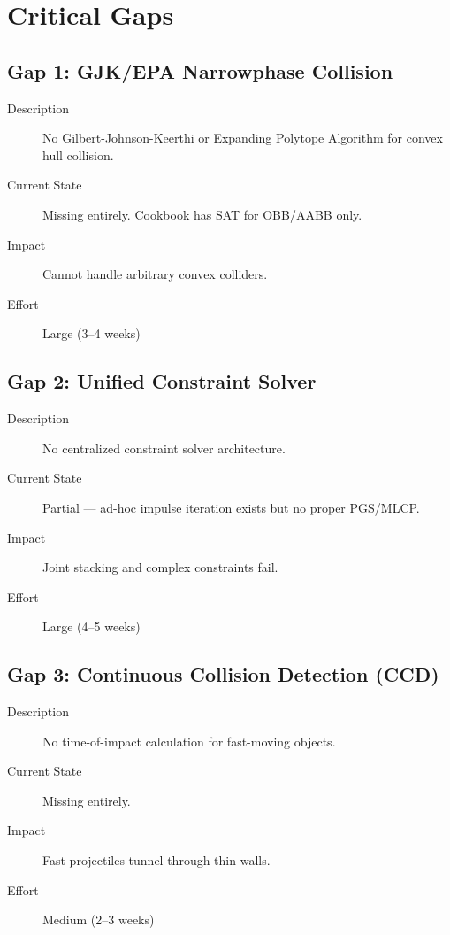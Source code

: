 \documentclass[11pt]{article}
\begin{document}
\section{Critical Gaps}

\subsection{Gap 1: GJK/EPA Narrowphase Collision}

\begin{description}
\item[Description] No Gilbert-Johnson-Keerthi or Expanding Polytope Algorithm for convex hull collision.
\item[Current State] Missing entirely. Cookbook has SAT for OBB/AABB only.
\item[Impact] Cannot handle arbitrary convex colliders.
\item[Effort] Large (3--4 weeks)
\end{description}

\subsection{Gap 2: Unified Constraint Solver}

\begin{description}
\item[Description] No centralized constraint solver architecture.
\item[Current State] Partial --- ad-hoc impulse iteration exists but no proper PGS/MLCP.
\item[Impact] Joint stacking and complex constraints fail.
\item[Effort] Large (4--5 weeks)
\end{description}

\subsection{Gap 3: Continuous Collision Detection (CCD)}

\begin{description}
\item[Description] No time-of-impact calculation for fast-moving objects.
\item[Current State] Missing entirely.
\item[Impact] Fast projectiles tunnel through thin walls.
\item[Effort] Medium (2--3 weeks)
\end{description}
\end{document}
